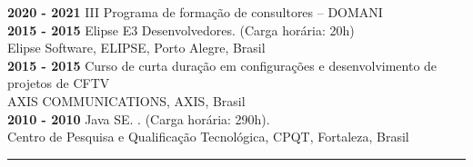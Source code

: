 \documentclass[12pt, a4paper]{article}
\newcommand{\LlinhaM}{1pt} 	 %
\newcommand{\TlinhaM}{17cm}		 %
\begin{document}
\begin{flushleft}
\begin{flushleft}
	\end{flushleft}
	\textbf{2020 - 2021} III Programa de formação de consultores – DOMANI\\
	\hfill \break
	\textbf{2015 - 2015} Elipse E3 Desenvolvedores. (Carga horária: 20h)\\
	Elipse Software, ELIPSE, Porto Alegre, Brasil\\
	\hfill \break
	\textbf{2015 - 2015} Curso de curta duração em configurações e desenvolvimento de projetos de CFTV\\
	AXIS COMMUNICATIONS, AXIS, Brasil\\
	\hfill \break
	\textbf{2010 - 2010} Java SE. . (Carga horária: 290h).\\
	Centro de Pesquisa e Qualificação Tecnológica, CPQT, Fortaleza, Brasil\\
\end{flushleft}





\begin{center}
	\rule{\TlinhaM}{\LlinhaM}
\end{center}
\end{document}
